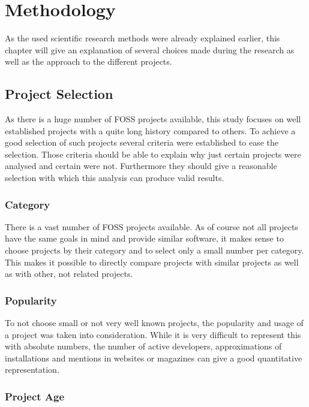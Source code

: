 \chapter{Methodology} %
\label{chap:methodology}

As the used scientific research methods were already explained earlier, this
chapter will give an explanation of several choices made during the research as
well as the approach to the different projects.

\section{Project Selection} %

As there is a huge number of \ac{FOSS} projects available, this study focuses
on well established projects with a quite long history compared to others. To
achieve a good selection of such projects several criteria were established to
ease the selection. Those criteria should be able to explain why just certain
projects were analysed and certain were not. Furthermore they should give a
reasonable selection with which this analysis can produce valid results.

\subsection{Category} %

There is a vast number of \ac{FOSS} projects available. As of course not all
projects have the same goals in mind and provide similar software, it makes
sense to choose projects by their category and to select only a small number
per category. This makes it possible to directly compare projects with similar
projects as well as with other, not related projects.


\subsection{Popularity} %

To not choose small or not very well known projects, the popularity and usage
of a project was taken into consideration. While it is very difficult to
represent this with absolute numbers, the number of active developers,
approximations of installations and mentions in websites or magazines can give
a good quantitative representation.


\subsection{Project Age} %

